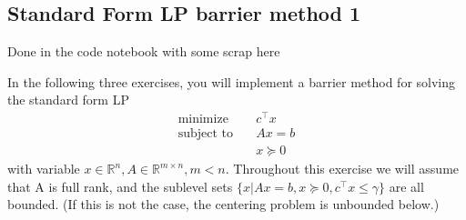 \subsection{Standard Form LP barrier method 1}
Done in the code notebook with some scrap here

In the following three exercises, you will implement a barrier method for solving the standard
form LP
\begin{align}
  \text{minimize} & \quad c^\top x \\
  \text{subject to} & \quad Ax = b \\
  & \quad  x \succeq 0
\end{align}
with variable $x \in \mathbb{R}^n, A \in \mathbb{R}^{m \times n}, m < n$. Throughout this exercise we will
assume that A is full rank, and the sublevel sets $\{x | Ax = b, x \succeq 0, c^\top x \leq \gamma\}$ are all
bounded. (If this is not the case, the centering problem is unbounded below.)
